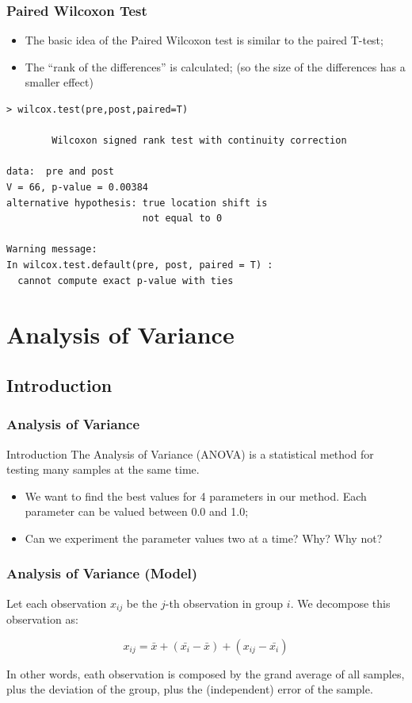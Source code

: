 \documentclass[10pt]{beamer}
\begin{document}
\begin{frame}
  \frametitle{Paired Wilcoxon Test}
  \begin{itemize}
  \item The basic idea of the Paired Wilcoxon test is similar to the paired T-test;
  \item The ``rank of the differences'' is calculated; (so the size of the differences has a smaller effect)
  \end{itemize}
  \begin{block}{}
\begin{verbatim}
> wilcox.test(pre,post,paired=T)

        Wilcoxon signed rank test with continuity correction

data:  pre and post 
V = 66, p-value = 0.00384
alternative hypothesis: true location shift is 
                        not equal to 0 

Warning message:
In wilcox.test.default(pre, post, paired = T) :
  cannot compute exact p-value with ties
\end{verbatim}
  \end{block}
\end{frame}

\section{Analysis of Variance} %
\subsection{Introduction}
\begin{frame}
  \frametitle{Analysis of Variance}
  \begin{block}{Introduction}
    The Analysis of Variance (ANOVA) is a statistical method for
    testing many samples at the same time.
  \end{block}
  \begin{itemize}
  \item We want to find the best values for 4 parameters in our
    method. Each parameter can be valued between 0.0 and 1.0;
  \item Can we experiment the parameter values two at a time? Why? Why
    not?
  \end{itemize}
\end{frame}

\begin{frame}
  \frametitle{Analysis of Variance (Model)}
  \begin{block}{}
    Let each observation $x_{ij}$ be the $j$-th observation in group
    $i$. We decompose this observation as:
  \end{block}
  \begin{equation*}
    x_{ij} = \bar{x} + (\bar{x_i} - \bar{x}) + (x_{ij} - \bar{x_i})
  \end{equation*}
  \begin{block}{}
    In other words, eath observation is composed by the grand average
    of all samples, plus the deviation of the group, plus the
    (independent) error of the sample.
  \end{block}
\end{frame}
\end{document}
